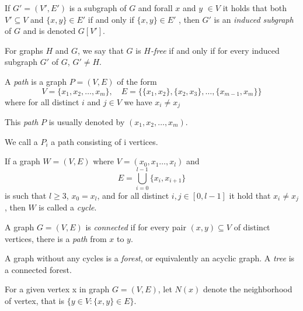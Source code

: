 \begin{definition}
  If $G' = (V', E')$ is a subgraph of $G$ and  forall $x$ and $y$ $\in V$ it holds that both  $ V' \subseteq V$ and $\{x,y\} \in E'$ if and only if  $\{x,y\} \in E'$ , then $G'$ is an \emph{induced subgraph} of $G$ and is denoted $G[V']$.
\end{definition}

\begin{definition}
    For graphs $H$ and $G$, we say that $G$ is \emph{$H$-free} if and only if for every induced subgraph $G'$ of $G$, $G' \ne H$.
\end{definition}


\begin{definition}[Path]
  A \emph{path} is a graph $P=(V,E)$ of the form \[ V = \{x_1, x_2, \ldots, x_m\},\quad E = \{ \{x_1,x_2\}, \{x_2,x_3\} , \ldots, \{x_{m-1},x_m\} \} \] where for all distinct $i$ and $j \in V$ we have $x_i \ne x_j $

  This \emph{path} $P$ is usually denoted by $(x_1, x_2, \ldots, x_m)$.
\end{definition}

 We call a $P_i$ a path consisting of i vertices.

\begin{definition}[Cycle]
  If a graph $W =(V,E)$ where $V=(x_0, x_1 \ldots , x_l)$ and \[E= \bigcup_{i=0}^{l-1} \{x_i,x_{i+1} \} \] is such that $l \geq 3$, $x_0 = x_l$, and for all distinct $i,j \in [0,l-1]$ it hold that  $x_i \neq x_j$ , then $W$ is called a \emph{cycle}.
\end{definition}

\begin{definition}
     A graph $G=(V,E)$ is \emph{connected} if for every pair $(x,y) \subseteq V$ of distinct vertices, there is a \emph{path} from $x$ to $y$.
\end{definition}

\begin{definition}
    A graph without any cycles is a \emph{forest}, or equivalently an acyclic graph. A \emph{tree} is a connected forest.
\end{definition}

\begin{definition}[Neighbours, $N(x)$]
    For a given vertex x in graph $G=(V,E)$, let $N(x)$ denote the neighborhood of vertex, that is $\{ y \in V \colon \{x,y\} \in E  \}$. 
\end{definition}

